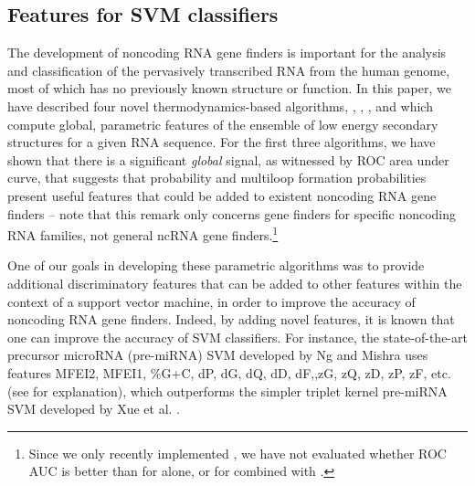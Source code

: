 \subsection*{Features for SVM classifiers}

The development of noncoding RNA gene finders is important for the
analysis and classification of the pervasively transcribed
RNA from the human genome, most of which has no previously known
structure or function.  In this paper, we have described
four novel thermodynamics-based algorithms, {\rnahairpin},
{\rnamlnumber}, {\rnamlorder}, and {\rnahairpinml} which
compute global, parametric features of the ensemble
of low energy secondary structures for a
given RNA sequence. For the first three algorithms, we have
shown that there is a significant {\em global} signal, as witnessed
by ROC area under curve, that suggests that probability and multiloop
formation probabilities present useful features that could be added
to existent noncoding RNA gene finders -- note that this remark only
concerns gene finders for specific noncoding RNA families, not general
ncRNA gene finders.\footnote{Since we only recently implemented
{\rnahairpinml}, we have not evaluated whether ROC AUC is better than
for {\rnahairpin} alone, or for {\rnahairpin} combined with {\rnamlnumber}.}

One of our goals in developing these parametric algorithms
was to provide additional discriminatory features that
can be added to other features within the context of
a support vector machine, in order to improve the accuracy of
noncoding RNA gene finders. Indeed, by adding novel features,
it is known that one can improve the accuracy of SVM classifiers.
For instance, the state-of-the-art precursor
microRNA (pre-miRNA) SVM developed by Ng and Mishra
\cite{Ng.b07} uses features
MFEI2, MFEI1, \%G+C, dP, dG, dQ, dD, dF,,zG, zQ, zD, zP, zF, etc.
(see \cite{Ng.b07} for explanation), which outperforms
the simpler
triplet kernel pre-miRNA SVM developed by Xue et al. \cite{Xue.bb05}.
